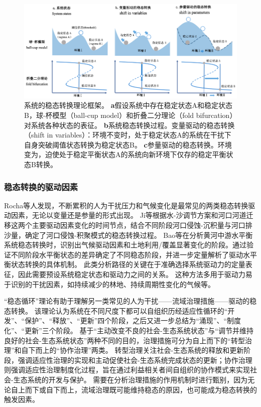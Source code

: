 \begin{figure}[htb] %
    \centering
    \includegraphics[width=\textwidth]{img/ch1/ch2_regime_shift.png}
    \caption[系统的稳态转换理论框架]{系统的稳态转换理论框架。
    \textbf{a}假设系统中存在稳定状态A和稳定状态B，球-杯模型（ball-cup model）和折叠二分理论（fold bifurcation）对系统各种状态的表征。
    \textbf{b}系统稳态转换过程。变量驱动的稳态转换（shift in variables）：环境\uppercase{}不变时，处于稳定状态A的系统在干扰下自身突破阈值状态转换为稳定状态B。
    \textbf{c}参量驱动的稳态转换。环境\uppercase{}变为\uppercase{}，迫使处于稳定平衡状态A的系统向新环境下仅存的稳定平衡状态B转换。}\label{ch1:fig:regime_shift}
\end{figure}

\subsubsection*{稳态转换的驱动因素}

Rocha等人发现，不断累积的人为干扰压力和气候变化是最常见的两类稳态转换驱动因素，无论以变量还是参量的形式出现\cite{rocha2018}。
Ji等根据水-沙调节方案和河口河道迁移这两个主要驱动因素变化的时间节点，结合不同阶段河口侵蚀-沉积量与河口排沙量，确定了河口侵蚀-积聚模式的稳态转换过程\cite{ji2018}。
Bao等在分析黄河中游水平衡系统稳态转换时，识别出气候驱动因素和土地利用/覆盖显著变化的阶段。通过验证不同阶段水平衡状态的差异确定了不同稳态阶段，并进一步定量解析了驱动水平衡状态转换的具体机制\cite{bao2019}。
此类分析路径的关键在于准确选择系统驱动力的定量表征，因此需要预设系统稳定状态和驱动力之间的关系。
这种方法多用于驱动力易于识别的干扰因素，如持续减少的林地、持续周期性变化的气候等。

“稳态循环”理论有助于理解另一类常见的人为干扰——流域治理措施——驱动的稳态转换。
该理论认为系统在不同尺度下都可以自组织历经适应性循环的“开发”、“保护”、“释放”、“更新”四个阶段\cite{gunderson2001}，之后又进一步总结为“涌现”、“制度化”、“更新”三个阶段。
基于“主动改变不良的社会-生态系统状态”与“调节并维持良好的社会-生态系统状态”两种不同的目的，治理措施可分为自上而下的“转型治理”和自下而上的“协作治理”两类\cite{song2019}。
转型治理关注社会-生态系统的释放和更新阶段，强调适应性治理的实现和主动促使社会-生态系统完成状态的更新；协作治理则强调适应性治理制度化过程，旨在通过利益相关者间自组织的协作模式来实现社会-生态系统的开发与保护\cite{song2019}。
需要在分析治理措施的作用机制时进行甄别，因为无论自上而下或自下而上，流域治理既可能维持稳态的原因，也可能成为稳态转换的触发因素。

